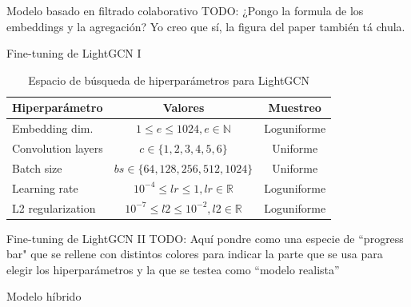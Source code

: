 \begin{frame}{Modelo basado en filtrado colaborativo}
    TODO: ¿Pongo la formula de los embeddings y la agregación? Yo creo que sí, la figura del paper también tá chula.
\end{frame}

\begin{frame}{Fine-tuning de LightGCN I}
\begin{table}[]
    \centering
    \begin{tabular}{l|c|c}
\textbf{Hiperparámetro} & \textbf{Valores} & \textbf{Muestreo} \\
\hline
Embedding dim. & $1\leq e\leq 1024, e\in \mathbb{N}$ & Loguniforme \\
Convolution layers & $c\in \{1,2,3,4,5,6\}$ & Uniforme \\
Batch size & $bs\in\{64,128,256,512,1024\}$ & Uniforme \\
Learning rate & $10^{-4}\leq lr\leq 1, lr\in \mathbb{R}$ & Loguniforme \\
L2 regularization & $10^{-7}\leq l2 \leq 10^{-2}, l2 \in \mathbb{R}$ & Loguniforme \\
    \end{tabular}
    \caption{Espacio de búsqueda de hiperparámetros para LightGCN}
\end{table}
\end{frame}

\begin{frame}{Fine-tuning de LightGCN II}
    TODO: Aquí pondre como una especie de ``progress bar" que se rellene con distintos colores para indicar la parte que se usa para elegir los hiperparámetros y la que se testea como ``modelo realista''
\end{frame}

\begin{frame}{Modelo híbrido}
\end{frame}